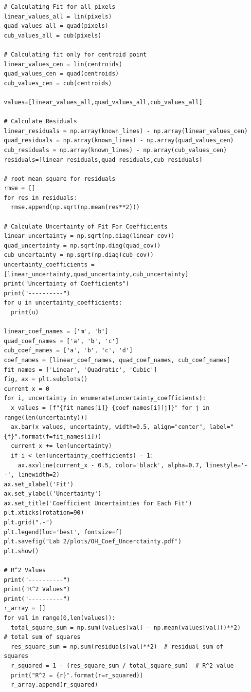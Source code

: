 \documentclass{article}
\begin{document}
\begin{appendices}
\begin{footnotesize}
\begin{verbatim}
# Calculating Fit for all pixels
linear_values_all = lin(pixels)
quad_values_all = quad(pixels)
cub_values_all = cub(pixels)

# Calculating fit only for centroid point
linear_values_cen = lin(centroids)
quad_values_cen = quad(centroids)
cub_values_cen = cub(centroids)

values=[linear_values_all,quad_values_all,cub_values_all]

# Calculate Residuals
linear_residuals = np.array(known_lines) - np.array(linear_values_cen)
quad_residuals = np.array(known_lines) - np.array(quad_values_cen)
cub_residuals = np.array(known_lines) - np.array(cub_values_cen)
residuals=[linear_residuals,quad_residuals,cub_residuals]

# root mean square for residuals
rmse = []
for res in residuals:
  rmse.append(np.sqrt(np.mean(res**2)))

# Calculate Uncertainty of Fit For Coefficients
linear_uncertainty = np.sqrt(np.diag(linear_cov))
quad_uncertainty = np.sqrt(np.diag(quad_cov))
cub_uncertainty = np.sqrt(np.diag(cub_cov))
uncertainty_coefficients = [linear_uncertainty,quad_uncertainty,cub_uncertainty]
print("Uncertainty of Coefficients")
print("----------")
for u in uncertainty_coefficients:
  print(u)

linear_coef_names = ['m', 'b']
quad_coef_names = ['a', 'b', 'c']
cub_coef_names = ['a', 'b', 'c', 'd']
coef_names = [linear_coef_names, quad_coef_names, cub_coef_names]
fit_names = ['Linear', 'Quadratic', 'Cubic']
fig, ax = plt.subplots()
current_x = 0
for i, uncertainty in enumerate(uncertainty_coefficients):
  x_values = [f"{fit_names[i]} {coef_names[i][j]}" for j in range(len(uncertainty))]
  ax.bar(x_values, uncertainty, width=0.5, align="center", label="{f}".format(f=fit_names[i]))
  current_x += len(uncertainty)
  if i < len(uncertainty_coefficients) - 1:
    ax.axvline(current_x - 0.5, color='black', alpha=0.7, linestyle='--', linewidth=2)
ax.set_xlabel('Fit')
ax.set_ylabel('Uncertainty')
ax.set_title('Coefficient Uncertainties for Each Fit')
plt.xticks(rotation=90)
plt.grid(".-")
plt.legend(loc='best', fontsize=f)
plt.savefig("Lab 2/plots/OH_Coef_Uncerctainty.pdf")
plt.show()

# R^2 Values
print("----------")
print("R^2 Values")
print("----------")
r_array = []
for val in range(0,len(values)):
  total_square_sum = np.sum((values[val] - np.mean(values[val]))**2)  # total sum of squares
  res_square_sum = np.sum(residuals[val]**2)  # residual sum of squares
  r_squared = 1 - (res_square_sum / total_square_sum)  # R^2 value
  print("R^2 = {r}".format(r=r_squared))
  r_array.append(r_squared)


\end{verbatim}
\end{footnotesize}
\end{appendices}
\end{document}
